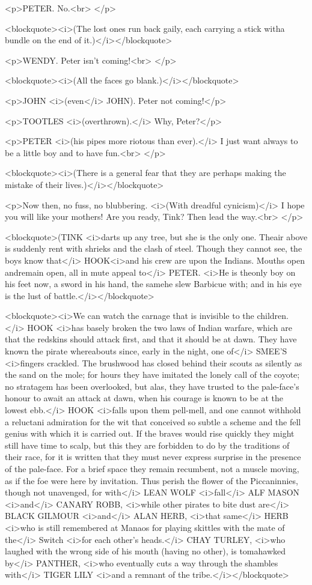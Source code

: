 <p>PETER. No.<br>
</p>

<blockquote><i>(The lost ones run back gaily, each carrying a stick
witha bundle on the end of it.)</i></blockquote>

<p>WENDY. Peter isn't coming!<br>
</p>

<blockquote><i>(All the faces go blank.)</i></blockquote>

<p>JOHN <i>(even</i> JOHN). Peter not coming!</p>

<p>TOOTLES <i>(overthrown).</i> Why, Peter?</p>

<p>PETER <i>(his pipes more riotous than ever).</i> I just want
always to be a little boy and to have fun.<br>
</p>

<blockquote><i>(There is a general fear that they are perhaps making
the mistake of their lives.)</i></blockquote>

<p>Now then, no fuss, no blubbering. <i>(With dreadful cynicism)</i>
I hope you will like your mothers! Are you ready, Tink? Then lead the
way.<br>
</p>

<blockquote>(TINK <i>darts up any tree, but she is the only one.
Theair above is suddenly rent with shrieks and the clash of steel.
Though they cannot see, the boys know that</i> HOOK<i>and his crew
are upon the Indians. Mouths open andremain open, all in mute appeal
to</i> PETER. <i>He is theonly boy on his feet now, a sword in his
hand, the samehe slew Barbicue with; and in his eye is the lust of
battle.</i></blockquote>

<blockquote><i>We can watch the carnage that is invisible to the
children.</i> HOOK <i>has basely broken the two laws of Indian
warfare, which are that the redskins should attack first, and that it
should be at dawn. They have known the pirate whereabouts since,
early in the night, one of</i> SMEE'S <i>fingers crackled. The
brushwood has closed behind their scouts as silently as the sand on
the mole; for hours they have imitated the lonely call of the coyote;
no stratagem has been overlooked, but alas, they have trusted to the
pale-face's honour to await an attack at dawn, when his courage is
known to be at the lowest ebb.</i> HOOK <i>falls upon them pell-mell,
and one cannot withhold a reluctani admiration for the wit that
conceived so subtle a scheme and the fell genius with which it is
carried out. If the braves would rise quickly they might still have
time to scalp, but this they are forbidden to do by the traditions of
their race, for it is written that they must never express surprise
in the presence of the pale-face. For a brief space they remain
recumbent, not a muscle moving, as if the foe were here by
invitation. Thus perish the flower of the Piccaninnies, though not
unavenged, for with</i> LEAN WOLF <i>fall</i> ALF MASON <i>and</i>
CANARY ROBB, <i>while other pirates to bite dust are</i> BLACK
GILMOUR <i>and</i> ALAN HERB, <i>that same</i> HERB <i>who is still
remembered at Manaos for playing skittles with the mate of the</i>
Switch <i>for each other's heads.</i> CHAY TURLEY, <i>who laughed
with the wrong side of his mouth (having no other), is tomahawked
by</i> PANTHER, <i>who eventually cuts a way through the shambles
with</i> TIGER LILY <i>and a remnant of the tribe.</i></blockquote>

